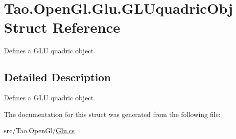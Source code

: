 \hypertarget{struct_tao_1_1_open_gl_1_1_glu_1_1_g_l_uquadric_obj}{
\section{Tao.OpenGl.Glu.GLUquadricObj Struct Reference}
\label{struct_tao_1_1_open_gl_1_1_glu_1_1_g_l_uquadric_obj}
}


Defines a GLU quadric object.  




\subsection{Detailed Description}
Defines a GLU quadric object. 

The documentation for this struct was generated from the following file:\begin{DoxyCompactItemize}
\item 
src/Tao.OpenGl/\hyperlink{_glu_8cs}{Glu.cs}\end{DoxyCompactItemize}
